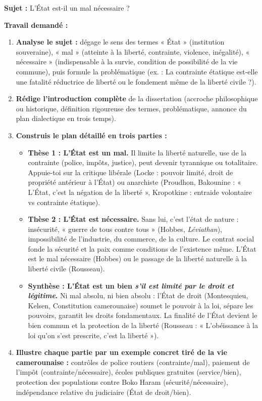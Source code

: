 \documentclass[11pt]{article}
\newcommand{\cle}[1]{{\popxbold\color{popdark}#1}}
\newcounter{popsec}
\newcounter{popsub}
\newcommand{\courssub}[1]{%
  \stepcounter{popsub}%
  \par\vspace{9pt}\noindent{\popxbold\fontsize{11.5}{13}\selectfont\color{popink}{\color{poporange}\thepopsec.\thepopsub}\hspace{6pt}#1}\par\nopagebreak\vspace{4pt}
}
\begin{document}
\courssub{Je me prépare au Bac}

\begin{exercice}
\textbf{Sujet :} L'État est-il un mal nécessaire ?

\textbf{Travail demandé :}
\begin{enumerate}
\item \textbf{Analyse le sujet :} dégage le sens des termes « État » (institution souveraine), « mal » (atteinte à la liberté, contrainte, violence, inégalité), « nécessaire » (indispensable à la survie, condition de possibilité de la vie commune), puis formule la \cle{problématique} (ex. : La contrainte étatique est-elle une fatalité réductrice de liberté ou le fondement même de la liberté civile ?).
\item \textbf{Rédige l'introduction complète} de la dissertation (accroche philosophique ou historique, définition rigoureuse des termes, problématique, annonce du plan dialectique en trois temps).
\item \textbf{Construis le plan détaillé en trois parties :}
\begin{itemize}
\item \textbf{Thèse 1 : L'État est un mal.} Il limite la liberté naturelle, use de la contrainte (police, impôts, justice), peut devenir tyrannique ou totalitaire. Appuie-toi sur la critique libérale (Locke : pouvoir limité, droit de propriété antérieur à l'État) ou anarchiste (Proudhon, Bakounine : « L'État, c'est la négation de la liberté », Kropotkine : entraide volontaire vs contrainte étatique).
\item \textbf{Thèse 2 : L'État est nécessaire.} Sans lui, c'est l'état de nature : insécurité, « guerre de tous contre tous » (Hobbes, \emph{Léviathan}), impossibilité de l'industrie, du commerce, de la culture. Le contrat social fonde la sécurité et la paix comme conditions de l'existence même. L'État est le \cle{mal nécessaire} (Hobbes) ou le \cle{passage de la liberté naturelle à la liberté civile} (Rousseau).
\item \textbf{Synthèse : L'État est un bien \emph{s'il est limité par le droit et légitime}.} Ni mal absolu, ni bien absolu : l'\cle{État de droit} (Montesquieu, Kelsen, Constitution camerounaise) soumet le pouvoir à la loi, sépare les pouvoirs, garantit les droits fondamentaux. La finalité de l'État devient le \cle{bien commun} et la \cle{protection de la liberté} (Rousseau : « L'obéissance à la loi qu'on s'est prescrite, c'est la liberté »).
\end{itemize}
\item \textbf{Illustre chaque partie par un exemple concret tiré de la vie camerounaise :} contrôles de police routiers (contrainte/mal), paiement de l'impôt (contrainte/nécessaire), écoles publiques gratuites (service/bien), protection des populations contre Boko Haram (sécurité/nécessaire), indépendance relative du judiciaire (État de droit/bien).
\end{enumerate}
\end{exercice}
\end{document}
